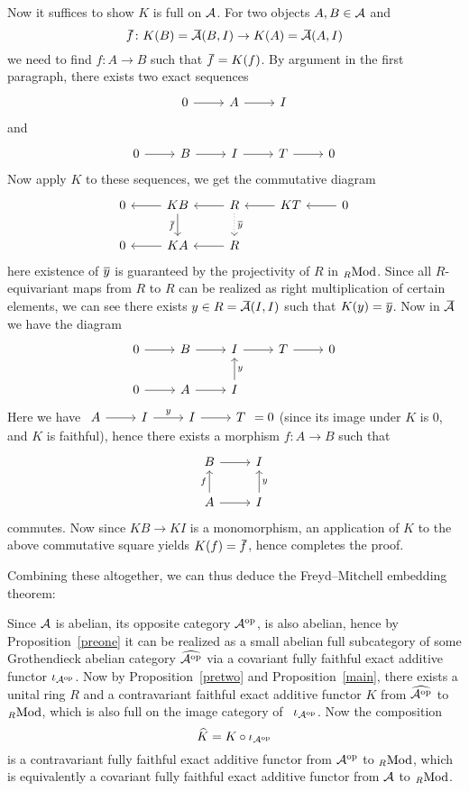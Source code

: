 \documentclass[twoside]{article}
\begin{document}
Now it suffices to show $K$ is full on ${\mathcal{A}}$. For two objects $A, B \in {\mathcal{A}}$ and $$\fbar\colon K(B) = \bea(B,I) \rightarrow K(A) = \bea(A, I)$$ we need to find $f\colon A \rightarrow B$ such that $\fbar = K(f)$. By argument in the first paragraph, there exists two exact sequences
$$\begin{tikzcd}
    0 \ar[r] & A \ar[r] & I
\end{tikzcd}$$
and $$\begin{tikzcd}
    0 \ar[r] & B \ar[r] & I \ar[r] & T \ar[r] & 0
\end{tikzcd}$$
Now apply $K$ to these sequences, we get the commutative  diagram $$\begin{tikzcd}
    0& KB \ar[d, "\fbar"'] \ar[l] & R \ar[d, dotted, "\ybar"]\ar[l] & KT\ar[l] & 0 \ar[l]\\
0 & KA \ar[l] & R \ar[l]
\end{tikzcd}$$
here existence of $\mkern1mu\overline{\mkern-1muy}$ is guaranteed by the projectivity of $R$ in ${}_R\mathrm{Mod}$. Since all $R$-equivariant maps from $R$ to $R$ can be realized as right multiplication of certain elements, we can see there exists $y \in R = \bea(I,I)$ such that $K(y) = \mkern1mu\overline{\mkern-1muy}$. Now in $\bea$ we have the diagram
$$\begin{tikzcd}
    0 \ar[r] & B \ar[r] & I  \ar[r] & T \ar[r] & 0 \\
0 \ar[r] & A \ar[r] & I \ar[u, "y"']
\end{tikzcd}$$
Here we have $\begin{tikzcd}
    A \ar[r] & I \ar[r, "y"] & I \ar[r] & T
\end{tikzcd} = 0$ (since its image under $K$ is $0$, and $K$ is faithful), hence there exists a morphism $f\colon A \rightarrow B$ such that 
$$\begin{tikzcd}
    B \ar[r] & I  \\
A \ar[u, "f"] \ar[r] & I \ar[u, "y"']
\end{tikzcd}$$
commutes. Now since $KB \rightarrow KI$ is a monomorphism, an application of $K$ to the above commutative square yields $K(f) = \fbar$, hence completes the proof.
\epf

Combining these altogether, we can thus deduce the Freyd--Mitchell embedding theorem:

Since ${\mathcal{A}}$ is abelian, its opposite category ${\mathcal{A}}^{\mathrm{op}}$, is also abelian, hence by Proposition~\ref{preone} it can be realized as a small abelian full subcategory of some Grothendieck abelian category $\widehat{{\mathcal{A}}^{\mathrm{op}}}$ via a covariant fully faithful exact additive functor $\iota_{{\mathcal{A}}^{\mathrm{op}}}$. Now by Proposition~\ref{pretwo} and Proposition~\ref{main}, there exists a unital ring $R$ and a contravariant faithful exact additive functor $K$ from $\widehat{{\mathcal{A}}^{\mathrm{op}}}$ to ${}_R\mathrm{Mod}$, which is also full on the image category of \ $\iota_{{\mathcal{A}}^{\mathrm{op}}}$. Now the composition $$\widehat{K} = K \circ \iota_{{\mathcal{A}}^{\mathrm{op}}}$$ is a contravariant fully faithful exact additive functor from ${\mathcal{A}}^{\mathrm{op}}$ to ${}_R\mathrm{Mod}$, which is equivalently a covariant fully faithful exact additive functor from ${\mathcal{A}}$ to ${}_R\mathrm{Mod}$. 
\epf
\end{document}
